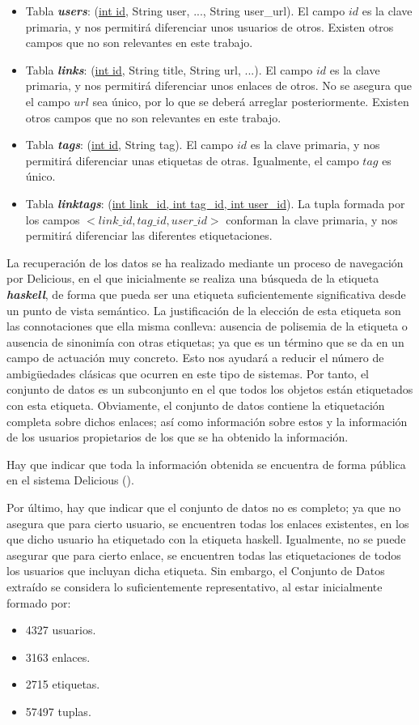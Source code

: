 \begin{itemize}
	\item Tabla \emph{{\bf users}}: (\underline{int id}, String user, ..., String user\_url). El campo $id$ es la clave primaria, y nos permitirá diferenciar unos usuarios de otros. Existen otros campos que no son relevantes en este trabajo.
	\item Tabla \emph{{\bf links}}: (\underline{int id}, String title, String url, ...). El campo $id$ es la clave primaria, y nos permitirá diferenciar unos enlaces de otros. No se asegura que el campo $url$ sea único, por lo que se deberá arreglar posteriormente. Existen otros campos que no son relevantes en este trabajo.
	\item Tabla \emph{{\bf tags}}: (\underline{int id}, String tag). El campo $id$ es la clave primaria, y nos permitirá diferenciar unas etiquetas de otras. Igualmente, el campo $tag$ es único.
	\item Tabla \emph{{\bf linktags}}: (\underline{int link\_id, int tag\_id,  int user\_id}). La tupla formada por los campos $<link\_id, tag\_id, user\_id>$ conforman la clave primaria, y nos permitirá diferenciar las diferentes etiquetaciones.
\end{itemize}


La recuperación de los datos se ha realizado mediante un proceso de navegación por Delicious, en el que inicialmente se realiza una búsqueda de la etiqueta \emph{\bf haskell}, de forma que pueda ser una etiqueta suficientemente significativa desde un punto de vista semántico. La justificación de la elección de esta etiqueta son las connotaciones que ella misma conlleva: ausencia de polisemia de la etiqueta o ausencia de sinonimía con otras etiquetas; ya que es un término que se da en un campo de actuación muy concreto. Esto nos ayudará a reducir el número de ambigüedades clásicas que ocurren en este tipo de sistemas. Por tanto, el conjunto de datos es un subconjunto en el que todos los objetos están etiquetados con esta etiqueta. Obviamente, el conjunto de datos contiene la etiquetación completa sobre dichos enlaces; así como información sobre estos y la información de los usuarios propietarios de los que se ha obtenido la información.

Hay que indicar que toda la información obtenida se encuentra de forma pública en el sistema Delicious (\cite{delicious}).

Por último, hay que indicar que el conjunto de datos no es completo; ya que no asegura que para cierto usuario, se encuentren todas los enlaces existentes, en los que dicho usuario ha etiquetado con la etiqueta haskell. Igualmente, no se puede asegurar que para cierto enlace, se encuentren todas las etiquetaciones de todos los usuarios que incluyan dicha etiqueta. Sin embargo, el Conjunto de Datos extraído se considera lo suficientemente representativo, al estar inicialmente formado por:
\begin{itemize}
	\item 4327 usuarios.
	\item 3163 enlaces.
	\item 2715 etiquetas.
	\item 57497 tuplas.
\end{itemize}




